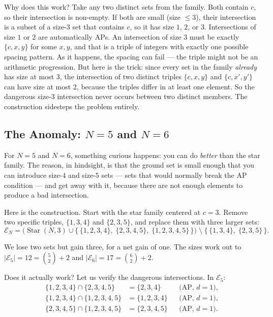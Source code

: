 \documentclass[11pt,a4paper]{article}
\theoremstyle{definition}
\begin{document}
Why does this work? Take any two distinct sets from the family. Both contain $c$, so
their intersection is non-empty. If both are small (size $\leq 3$), their
intersection is a subset of a size-3 set that contains $c$, so it has size $1$, $2$,
or $3$. Intersections of size $1$ or $2$ are automatically APs. An intersection of
size $3$ must be exactly $\{c, x, y\}$ for some $x, y$, and that is a triple of
integers with exactly one possible spacing pattern. As it happens, the spacing can
fail --- the triple might not be an arithmetic progression. But here is the trick:
since every set in the family \emph{already} has size at most $3$, the intersection
of two distinct triples $\{c, x, y\}$ and $\{c, x', y'\}$ can have size at most $2$,
because the triples differ in at least one element. So the dangerous size-3
intersection never occurs between two distinct members. The construction sidesteps
the problem entirely.

\subsection{The Anomaly: $N=5$ and $N=6$}

For $N=5$ and $N=6$, something curious happens: you can do \emph{better} than the
star family. The reason, in hindsight, is that the ground set is small enough that
you can introduce size-$4$ and size-$5$ sets --- sets that would normally break the
AP condition --- and get away with it, because there are not enough elements to
produce a bad intersection.

Here is the construction. Start with the star family centered at $c=3$. Remove two
specific triples, $\{1,3,4\}$ and $\{2,3,5\}$, and replace them with three larger
sets:
\[
\mathcal{E}_N = \bigl(\operatorname{Star}(N,3) \cup
    \{\,\{1,2,3,4\},\; \{2,3,4,5\},\; \{1,2,3,4,5\}\,\}\bigr) \;\setminus\;
    \{\,\{1,3,4\},\; \{2,3,5\}\,\}.
\]

We lose two sets but gain three, for a net gain of one. The sizes work out to
$|\mathcal{E}_5| = 12 = \binom{5}{2} + 2$ and $|\mathcal{E}_6| = 17 = \binom{6}{2} + 2$.

Does it actually work? Let us verify the dangerous intersections. In $\mathcal{E}_5$:
\[
\begin{aligned}
\{1,2,3,4\} \cap \{2,3,4,5\}      &= \{2,3,4\}       &&\text{(AP, }d=1\text{)},\\
\{1,2,3,4\} \cap \{1,2,3,4,5\}    &= \{1,2,3,4\}     &&\text{(AP, }d=1\text{)},\\
\{2,3,4,5\} \cap \{1,2,3,4,5\}    &= \{2,3,4,5\}     &&\text{(AP, }d=1\text{)}.
\end{aligned}
\]
\end{document}
